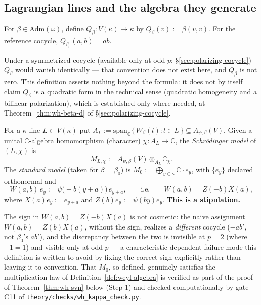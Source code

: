 \subsection{Lagrangian lines and the algebra they generate}

\begin{definition}
\label{def:quadratic-form}
For $\beta\in\mathrm{Adm}(\omega)$, define $Q_\beta : V(\kappa)\to\kappa$ by
$Q_\beta(v):=\beta(v,v)$. For the reference cocycle,
$Q_{\beta_0}(a,b)=ab$.
\end{definition}

\begin{scope}
Under a symmetrized cocycle (available only at odd $p$; \S\ref{sec:polarizing-cocycle})
$Q_\beta$ would vanish identically — that convention does not exist here, and
$Q_\beta$ is not zero. This definition asserts nothing beyond the formula: it
does not by itself claim $Q_\beta$ is a quadratic form in the technical sense
(quadratic homogeneity and a bilinear polarization), which is established
only where needed, at Theorem~\ref{thm:wh-beta-d} of \S\ref{sec:polarizing-cocycle}.
\end{scope}


\begin{definition}
\label{def:schrodinger-model}
For a $\kappa$-line $L\subset V(\kappa)$ put
$A_L := \mathrm{span}_{\mathbb{C}}\{\,W_\beta(l) : l\in L\,\} \subseteq A_{\psi,\beta}(V)$.
Given a unital $\mathbb{C}$-algebra homomorphism (character)
$\chi : A_L \to \mathbb{C}$, the \emph{Schr\"odinger model} of $(L,\chi)$ is
\[
M_{L,\chi} := A_{\psi,\beta}(V) \otimes_{A_L} \mathbb{C}_\chi .
\]
The \emph{standard model} (taken for $\beta=\beta_0$) is
$M_0 := \bigoplus_{y\in\kappa}\mathbb{C}\cdot e_y$, with $\{e_y\}$ declared
orthonormal and
\[
W(a,b)\,e_y := \psi\big(-b(y+a)\big)\, e_{y+a}, \qquad\text{i.e.}\qquad
W(a,b) = Z(-b)X(a),
\]
where $X(a)e_y := e_{y+a}$ and $Z(b)e_y := \psi(by)e_y$. \textbf{This is a
stipulation.}
\end{definition}

\begin{scope}
The sign in $W(a,b)=Z(-b)X(a)$ is not cosmetic: the naive assignment
$W(a,b)=Z(b)X(a)$, without the sign, realizes a \emph{different} cocycle
($-ab'$, not $\beta_0$'s $ab'$), and the discrepancy between the two is
invisible at $p=2$ (where $-1=1$) and visible only at odd $p$ — a
characteristic-dependent failure mode this definition is written to avoid
by fixing the correct sign explicitly rather than leaving it to convention.
That $M_0$, so defined, genuinely satisfies the multiplication law of
Definition~\ref{def:weyl-algebra} is verified as part of the proof of
Theorem~\ref{thm:wh-svn} below (Step 1) and checked computationally by gate
C11 of \texttt{theory\slash{}checks\slash{}wh\_kappa\_check.py}.
\end{scope}

